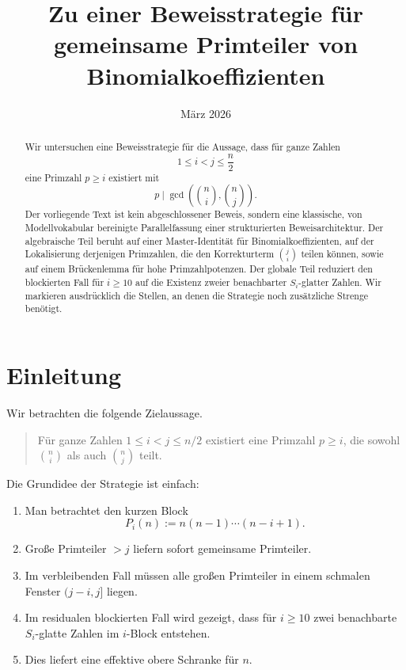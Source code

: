 \documentclass[12pt,a4paper]{article}
\title{Zu einer Beweisstrategie für gemeinsame Primteiler von Binomialkoeffizienten}
\author{}
\date{März 2026}
\theoremstyle{plain}
\theoremstyle{definition}
\theoremstyle{remark}
\begin{document}
	
	\maketitle
	
	\begin{abstract}
		Wir untersuchen eine Beweisstrategie für die Aussage, dass für ganze Zahlen
		\[
		1\le i<j\le \frac n2
		\]
		eine Primzahl \(p\ge i\) existiert mit
		\[
		p\mid \gcd\!\left(\binom ni,\binom nj\right).
		\]
		Der vorliegende Text ist kein abgeschlossener Beweis, sondern eine klassische, von Modellvokabular bereinigte Parallelfassung einer strukturierten Beweisarchitektur. Der algebraische Teil beruht auf einer Master-Identität für Binomialkoeffizienten, auf der Lokalisierung derjenigen Primzahlen, die den Korrekturterm \(\binom ji\) teilen können, sowie auf einem Brückenlemma für hohe Primzahlpotenzen. Der globale Teil reduziert den blockierten Fall für \(i\ge 10\) auf die Existenz zweier benachbarter \(S_i\)-glatter Zahlen. Wir markieren ausdrücklich die Stellen, an denen die Strategie noch zusätzliche Strenge benötigt.
	\end{abstract}
	
	\tableofcontents
	
	\section{Einleitung}
	
	Wir betrachten die folgende Zielaussage.
	
	\begin{quote}
		Für ganze Zahlen \(1\le i<j\le n/2\) existiert eine Primzahl \(p\ge i\), die sowohl \(\binom ni\) als auch \(\binom nj\) teilt.
	\end{quote}
	
	Die Grundidee der Strategie ist einfach:
	
	\begin{enumerate}[label=\arabic*)]
		\item Man betrachtet den kurzen Block
		\[
		P_i(n):=n(n-1)\cdots(n-i+1).
		\]
		\item Große Primteiler \(>j\) liefern sofort gemeinsame Primteiler.
		\item Im verbleibenden Fall müssen alle großen Primteiler in einem schmalen Fenster \((j-i,j]\) liegen.
		\item Im residualen blockierten Fall wird gezeigt, dass für \(i\ge 10\) zwei benachbarte \(S_i\)-glatte Zahlen im \(i\)-Block entstehen.
		\item Dies liefert eine effektive obere Schranke für \(n\).
	\end{enumerate}
	
\end{document}
